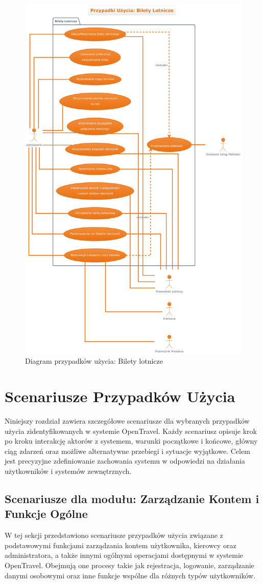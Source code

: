 \documentclass[a4paper,12pt]{article}
\begin{document}
\begin{figure}[H]
    \centering
    \includegraphics[width=0.8\linewidth]{diagramy/przypadki_uzycia/images/diagram_bilety_lotnicze_1.png}
    \caption{Diagram przypadków użycia: Bilety lotnicze}
    \label{fig:diag_bl_1}
\end{figure}

\newpage
\section{Scenariusze Przypadków Użycia}
\label{sec:scenarios}
Niniejszy rozdział zawiera szczegółowe scenariusze dla wybranych przypadków użycia zidentyfikowanych w systemie OpenTravel. Każdy scenariusz opisuje krok po kroku interakcję aktorów z systemem, warunki początkowe i końcowe, główny ciąg zdarzeń oraz możliwe alternatywne przebiegi i sytuacje wyjątkowe. Celem jest precyzyjne zdefiniowanie zachowania systemu w odpowiedzi na działania użytkowników i systemów zewnętrznych.

\subsection{Scenariusze dla modułu: Zarządzanie Kontem i Funkcje Ogólne}
W tej sekcji przedstawiono scenariusze przypadków użycia związane z podstawowymi funkcjami zarządzania kontem użytkownika, kierowcy oraz administratora, a także innymi ogólnymi operacjami dostępnymi w systemie OpenTravel. Obejmują one procesy takie jak rejestracja, logowanie, zarządzanie danymi osobowymi oraz inne funkcje wspólne dla różnych typów użytkowników.
\end{document}
